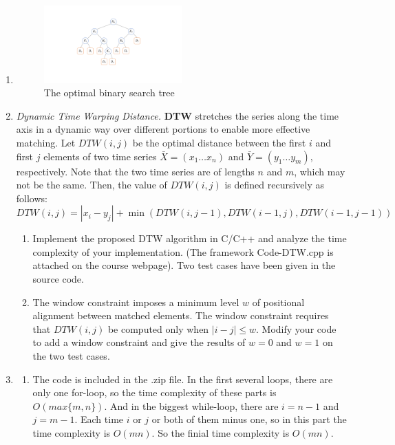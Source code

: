 \documentclass[12pt,a4paper]{article}
\makeatletter
\newtheorem*{solution}{Solution}
\theoremstyle{definition}
\renewenvironment{solution}[1][Solution] {\par\pushQED{\qed}\normalfont\topsep6\p@\@plus6\p@\relax\trivlist\item[\hskip\labelsep\bfseries#1\@addpunct{.}]\ignorespaces}{\popQED\endtrivlist\@endpefalse} \makeatother
\makeatother
\begin{document}
\begin{enumerate}
\begin{solution}
\begin{enumerate}
				\begin{figure}[H]
    \centering
    \includegraphics[width=0.5\textwidth]{opbst.pdf}
    \caption{The optimal binary search tree}
\end{figure}
		        \end{enumerate}
		    \end{solution}
		
		\item \textit{Dynamic Time Warping Distance.} \textbf{DTW} stretches the series along the time axis in a dynamic way over different
		portions to enable more effective matching. Let $D T W(i, j)$ be the optimal distance between the first $i$ and first $j$ elements of two time series $\bar{X}=\left(x_{1} \ldots x_{n}\right)$ and $\bar{Y}=\left(y_{1} \ldots y_{m}\right),$ respectively. Note that the two time series are of lengths $n$ and $m$, which may not be the same. Then, the value of $D T W(i, j)$ is defined recursively as follows:
		$$
		DTW(i, j)=\left|x_{i}- y_{j}\right|+\min(DTW(i, j-1), DTW(i-1, j), DTW(i-1, j-1))
		$$
		
		\begin{enumerate}
			\item Implement the proposed DTW algorithm in C/C++ and analyze the time complexity of your implementation. ({\color{blue}The framework Code-DTW.cpp is attached on the course webpage}). Two test cases have been given in the source code. 
			\item The window constraint imposes a minimum level $w$ of positional alignment between matched elements. The window constraint requires that $DTW(i, j)$ be computed only when $|i-j| \leq w$. Modify your code to add a window constraint and give the results of $ w=0 $ and $ w=1 $ on the two test cases. 
		\end{enumerate}
		    \begin{solution}
		       \begin{enumerate}
		       		\item The code is included in the .zip file. In the first several loops, there are only one for-loop, so the time complexity of these parts is $O(max\{m,n\})$. And in the biggest while-loop, there are $i = n - 1$ and $j = m-1$. Each time $i$ or $j$ or both of them minus one, so in this part the time complexity is $O(mn)$. So the finial time complexity is $O(mn)$.\\
		       		

\end{enumerate}
\end{solution}
\end{enumerate}
\end{document}
